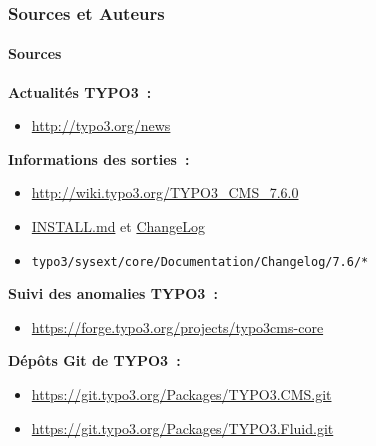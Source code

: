 \begin{frame}[fragile]
	\frametitle{Sources et Auteurs}
	\framesubtitle{Sources}

	\textbf{Actualités TYPO3~:}
		\begin{itemize}\smaller
			\item \url{http://typo3.org/news}
		\end{itemize}

	\textbf{Informations des sorties~:}
		\begin{itemize}\smaller
			\item \url{http://wiki.typo3.org/TYPO3_CMS_7.6.0}
			\item \href{https://github.com/TYPO3/TYPO3.CMS/blob/master/INSTALL.md}{INSTALL.md} et \href{https://github.com/TYPO3/TYPO3.CMS/blob/master/ChangeLog}{ChangeLog}
			\item \texttt{typo3/sysext/core/Documentation/Changelog/7.6/*}
		\end{itemize}

	\textbf{Suivi des anomalies TYPO3~:}
		\begin{itemize}\smaller
			\item \url{https://forge.typo3.org/projects/typo3cms-core}
		\end{itemize}

	\textbf{Dépôts Git de TYPO3~:}
		\begin{itemize}\smaller
			\item \url{https://git.typo3.org/Packages/TYPO3.CMS.git}
			\item \url{https://git.typo3.org/Packages/TYPO3.Fluid.git}
		\end{itemize}

\end{frame}


